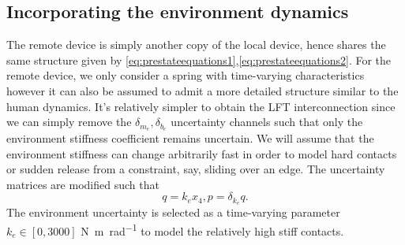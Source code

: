 \subsection{Incorporating the environment dynamics}
The remote device is simply another copy of the local device, hence shares the same structure given by
\eqref{eq:prestateequations1},\eqref{eq:prestateequations2}. For the remote device, we only consider a spring with time-varying characteristics however it can also be assumed to admit 
a more detailed structure similar to the human dynamics. It's relatively simpler to obtain the LFT interconnection since we 
can simply remove the $\delta_{m_e},\delta_{b_e}$ uncertainty channels such that only the environment stiffness coefficient
remains uncertain. We will assume that the environment stiffness can change arbitrarily fast in order to model hard contacts
or sudden release from a constraint, say, sliding over an edge. The uncertainty matrices are modified such that
\[
q = k_e x_4, p = \delta_{k_e} q.
\]
The environment uncertainty is selected as a time-varying parameter $k_e\in[0,3000]$ \si{\newton\meter\per\radian} to model 
the relatively high stiff contacts.


